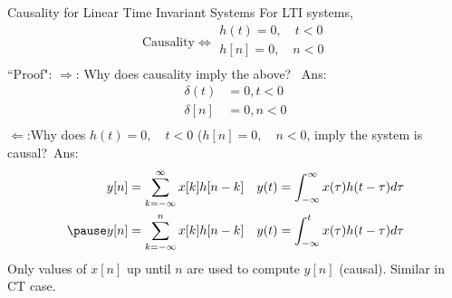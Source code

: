 \begin{frame}{Causality for Linear Time Invariant Systems}    For LTI systems,
    \begin{equation*}
        \text{Causality} \Leftrightarrow \begin{split}h(t) = 0, \quad  t <0\\  h[n] = 0, \quad  n <0\\      \end{split}
    \end{equation*}
    ``Proof":
    $\Rightarrow$:  Why does causality imply the above? \pause~Ans:
    {
    \begin{align*}
      \delta(t) &=  0, t<0\\
      \delta[n] &=  0, n<0\\
    \end{align*}
    }
    {
        \vspace{.5in}
    }
    \pause
    $\Leftarrow$:Why does $h(t) = 0, \quad  t <0$ ($h[n] = 0, \quad  n <0$, imply the system is causal?\pause~Ans:
    {
    \begin{equation*}
        \begin{split}
            y[n] = \sum_{k=-\infty}^{\infty}x[k]h[n-k] \quad & y(t) = \int_{-\infty}^{\infty}x(\tau)h(t-\tau)d\tau\\ \pause
            y[n] = \sum_{k=-\infty}^{n}x[k]h[n-k] \quad & y(t) = \int_{-\infty}^{t}x(\tau)h(t-\tau)d\tau
        \end{split}
    \end{equation*}
    Only values of $x[n]$ up until $n$ are used to compute  $y[n]$ (causal). Similar in CT case.
    }
\end{frame}

